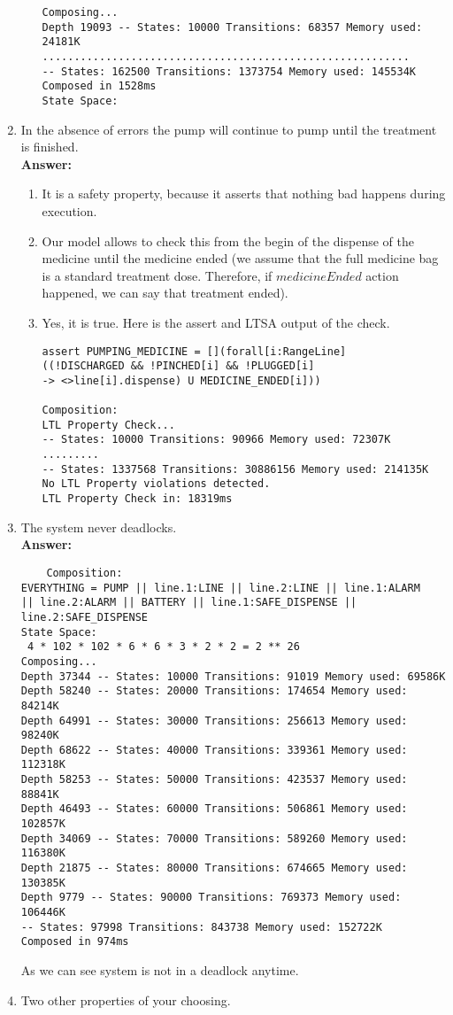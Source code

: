 \documentclass{article}
\begin{document}
\begin{enumerate}
\begin{enumerate}
\begin{verbatim}
Composing...
Depth 19093 -- States: 10000 Transitions: 68357 Memory used: 24181K
..........................................................
-- States: 162500 Transitions: 1373754 Memory used: 145534K
Composed in 1528ms
State Space:
\end{verbatim}
	\end{enumerate}
    \item In the absence of errors the pump will continue to pump until the
treatment is finished.\\
    \textbf{Answer:} 
    \begin{enumerate}
    	\item It is a safety property, because it asserts that nothing bad happens during execution.
    	\item Our model allows to check this from the begin of the dispense of the medicine until the medicine ended 
    	(we assume that the full medicine bag is a standard treatment dose. Therefore, if $medicineEnded$ action happened, we can say that treatment ended).
    	\item Yes, it is true. Here is the assert and LTSA output of the check.
\begin{verbatim}
assert PUMPING_MEDICINE = [](forall[i:RangeLine] 
((!DISCHARGED && !PINCHED[i] && !PLUGGED[i] 
-> <>line[i].dispense) U MEDICINE_ENDED[i]))

Composition:
LTL Property Check...
-- States: 10000 Transitions: 90966 Memory used: 72307K
.........
-- States: 1337568 Transitions: 30886156 Memory used: 214135K
No LTL Property violations detected.
LTL Property Check in: 18319ms
\end{verbatim}
	\end{enumerate}
    \item The system never deadlocks.\\
    \textbf{Answer:}
    \begin{verbatim}
    Composition:
EVERYTHING = PUMP || line.1:LINE || line.2:LINE || line.1:ALARM 
|| line.2:ALARM || BATTERY || line.1:SAFE_DISPENSE || line.2:SAFE_DISPENSE
State Space:
 4 * 102 * 102 * 6 * 6 * 3 * 2 * 2 = 2 ** 26
Composing...
Depth 37344 -- States: 10000 Transitions: 91019 Memory used: 69586K
Depth 58240 -- States: 20000 Transitions: 174654 Memory used: 84214K
Depth 64991 -- States: 30000 Transitions: 256613 Memory used: 98240K
Depth 68622 -- States: 40000 Transitions: 339361 Memory used: 112318K
Depth 58253 -- States: 50000 Transitions: 423537 Memory used: 88841K
Depth 46493 -- States: 60000 Transitions: 506861 Memory used: 102857K
Depth 34069 -- States: 70000 Transitions: 589260 Memory used: 116380K
Depth 21875 -- States: 80000 Transitions: 674665 Memory used: 130385K
Depth 9779 -- States: 90000 Transitions: 769373 Memory used: 106446K
-- States: 97998 Transitions: 843738 Memory used: 152722K
Composed in 974ms
    \end{verbatim}
    As we can see system is not in a deadlock anytime.
    \item Two other properties of your choosing.
\end{enumerate}
\end{document}
